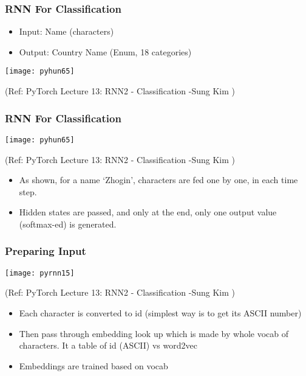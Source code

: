 \begin{frame}[fragile] \frametitle{RNN For Classification}

\begin{itemize}
\item Input: Name (characters)
\item Output: Country Name (Enum, 18 categories)
\end{itemize}

 
 
\begin{center}
\texttt{[image: pyhun65]}

\tiny{(Ref:  PyTorch Lecture 13: RNN2 - Classification -Sung Kim )}
\end{center}


\end{frame}

\begin{frame}[fragile] \frametitle{RNN For Classification}

 
\begin{center}
\texttt{[image: pyhun65]}

\tiny{(Ref:  PyTorch Lecture 13: RNN2 - Classification -Sung Kim )}
\end{center}
\begin{itemize}
\item As shown, for a name `Zhogin', characters are fed one by one, in each time step.
\item Hidden states are passed, and only at the end, only one output value (softmax-ed) is generated.
\end{itemize}

\end{frame}

\begin{frame}[fragile] \frametitle{Preparing Input}

 
\begin{center}
\texttt{[image: pyrnn15]}

\tiny{(Ref:  PyTorch Lecture 13: RNN2 - Classification -Sung Kim )}
\end{center}
\begin{itemize}
\item Each character is converted to id (simplest way is to get its ASCII number)
\item Then pass through embedding look up which is made by whole vocab of characters. It a table of id (ASCII) vs word2vec
\item Embeddings are trained based on vocab
\end{itemize}

\end{frame}

